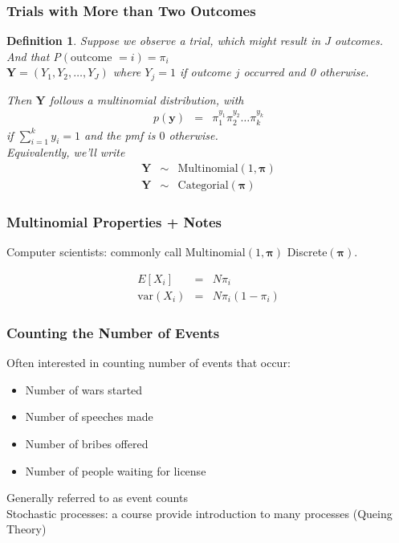 \documentclass{beamer}
\newtheorem{defn}{Definition}
\numberwithin{equation}{section}
\begin{document}
\begin{frame}
\frametitle{Trials with More than Two Outcomes}


\begin{defn}
Suppose we observe a trial, which might result in $J$ outcomes.  \\
And that P$(\text{outcome } = i) = \pi_{i}$ \\
$\boldsymbol{Y} = (Y_{1}, Y_{2}, \hdots, Y_{J})$  where $Y_{j} = 1$ if outcome $j$ occurred and 0 otherwise. 

Then $\boldsymbol{Y}$ follows a \alert{multinomial} distribution, with \\
\begin{eqnarray}
p(\boldsymbol{y} ) & = & \pi_{1}^{y_{1}} \pi_{2}^{y_{2} } \hdots \pi_{k}^{y_{k}} \nonumber 
\end{eqnarray}
if $\sum_{i=1}^{k} y_{i} = 1$ and the pmf is $0$ otherwise.  \\
Equivalently, we'll write 
\begin{eqnarray}
\boldsymbol{Y} & \sim & \text{Multinomial}(1, \boldsymbol{\pi}) \nonumber \\
\boldsymbol{Y} & \sim & \text{Categorial}(\boldsymbol{\pi}) \nonumber 
\end{eqnarray}
\end{defn}
\end{frame}


\begin{frame}
\frametitle{Multinomial Properties + Notes}
Computer scientists: commonly call Multinomial$(1, \boldsymbol{\pi})$ \alert{Discrete}$(\boldsymbol{\pi})$. 

\begin{eqnarray}
E[X_{i} ] & = &  N \pi_{i} \nonumber \\
\text{var}(X_{i} ) & = &  N \pi_{i} (1- \pi_{i}) \nonumber 
\end{eqnarray}

\end{frame}

\begin{frame}
\frametitle{Counting the Number of Events}

Often interested in counting number of events that occur:
\begin{itemize}
\item[1)] Number of wars started
\item[2)] Number of speeches made
\item[3)] Number of bribes offered
\item[4)] Number of people waiting for license
\end{itemize}

Generally referred to as \alert{event counts}\\
\alert{Stochastic processes}: a course provide introduction to many processes (\alert{Queing Theory})


\end{frame}
\end{document}
